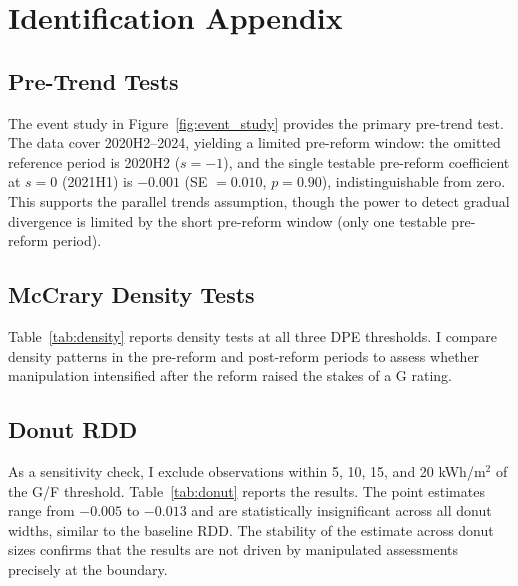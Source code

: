 \documentclass[12pt]{article}
\begin{document}
\section{Identification Appendix}
\label{sec:id_appendix}

\subsection{Pre-Trend Tests}

The event study in Figure~\ref{fig:event_study} provides the primary pre-trend test. The data cover 2020H2--2024, yielding a limited pre-reform window: the omitted reference period is 2020H2 ($s = -1$), and the single testable pre-reform coefficient at $s = 0$ (2021H1) is $-0.001$ (SE $= 0.010$, $p = 0.90$), indistinguishable from zero. This supports the parallel trends assumption, though the power to detect gradual divergence is limited by the short pre-reform window (only one testable pre-reform period).

\subsection{McCrary Density Tests}

Table~\ref{tab:density} reports density tests at all three DPE thresholds. I compare density patterns in the pre-reform and post-reform periods to assess whether manipulation intensified after the reform raised the stakes of a G rating.

\subsection{Donut RDD}

As a sensitivity check, I exclude observations within 5, 10, 15, and 20 kWh/m$^2$ of the G/F threshold. Table~\ref{tab:donut} reports the results. The point estimates range from $-0.005$ to $-0.013$ and are statistically insignificant across all donut widths, similar to the baseline RDD. The stability of the estimate across donut sizes confirms that the results are not driven by manipulated assessments precisely at the boundary.
\end{document}
